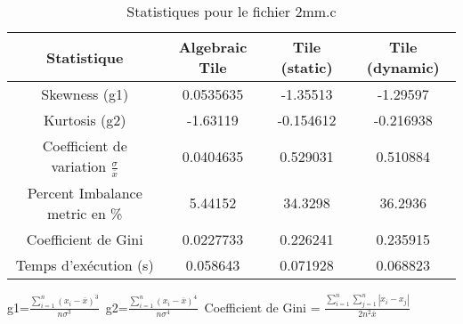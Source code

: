 \documentclass{article}
\begin{document}
\begin{table}[htbp]
  \centering
  \caption{Statistiques pour le fichier 2mm.c}
  \begin{tabular}{|c|c|c|c|}
    \hline
    Statistique & Algebraic Tile & Tile (static) & Tile (dynamic) \\ 
    \hline
    Skewness (g1)  & 0.0535635 & -1.35513 & -1.29597 \\ 
    Kurtosis (g2)  & -1.63119 & -0.154612 & -0.216938 \\ 
    Coefficient de variation $ \frac{\sigma}{\overline{x}} $ & 0.0404635 & 0.529031 & 0.510884\\ 
    Percent Imbalance metric en \% & 5.44152 & 34.3298 & 36.2936\\ 
    Coefficient de Gini  & 0.0227733 & 0.226241 & 0.235915\\ 
    Temps d'exécution (s) &  0.058643    &  0.071928   &  0.068823   \\ 

    \hline
  \end{tabular}
\end{table}
g1=$ \frac{\sum_{i=1}^{n} (x_i - \overline{x})^3}{n\sigma^3} $\
g2=$ \frac{\sum_{i=1}^{n} (x_i - \overline{x})^4}{n\sigma^4} $\
Coefficient de Gini = $ \frac{\sum_{i=1}^{n}\sum_{j=1}^{n} |x_i - x_j|}{2n^2\overline{x}} $\
\newpage
\end{document}
